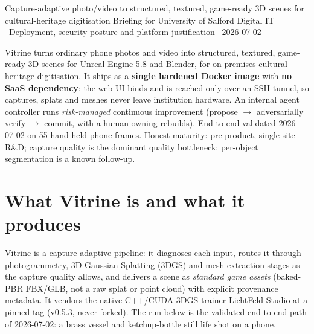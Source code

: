 \documentclass[a4paper,11pt]{article}
\begin{document}
%
{Capture-adaptive photo/video to structured, textured, game-ready 3D scenes for cultural-heritage digitisation}%
{Briefing for University of Salford Digital IT \textbullet\ Deployment, security posture and platform justification \textbullet\ 2026-07-02}

\begin{keyfinding}
Vitrine turns ordinary phone photos and video into structured, textured, game-ready 3D
scenes for Unreal Engine 5.8 and Blender, for on-premises cultural-heritage digitisation.
It ships as a \textbf{single hardened Docker image} with \textbf{no SaaS dependency}: the web
UI binds  and is reached only over an SSH tunnel, so captures, splats
and meshes never leave institution hardware. An internal agent controller runs
\emph{risk-managed} continuous improvement (propose $\to$ adversarially verify $\to$ commit,
with a human owning rebuilds). End-to-end validated 2026-07-02 on 55 hand-held phone frames.
Honest maturity: pre-product, single-site R\&D; capture quality is the dominant quality
bottleneck; per-object segmentation is a known follow-up.
\end{keyfinding}

\section{What Vitrine is and what it produces}

Vitrine is a capture-adaptive pipeline: it diagnoses each input, routes it through
photogrammetry, 3D Gaussian Splatting (3DGS) and mesh-extraction stages as the capture
quality allows, and delivers a scene as \emph{standard game assets} (baked-PBR FBX/GLB, not a
raw splat or point cloud) with explicit  provenance metadata. It vendors the
native C++/CUDA 3DGS trainer LichtFeld Studio at a pinned tag (v0.5.3, never forked). The
run below is the validated end-to-end path of 2026-07-02: a brass vessel and ketchup-bottle
still life shot on a phone.
\end{document}
